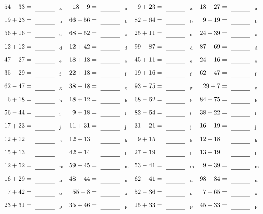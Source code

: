 \documentclass
[
  draft    = true,
  fontsize = 11pt,
  parskip  = half-
]
{scrartcl}
\begin{document}
\clearpage
\begin{align*}
    \pline{54-33}&=\rline{a}
  & \pline{18+9}&=\rline{a}
  & \pline{9+23}&=\rline{a}
  & \pline{18+27}&=\rline{a} \\[1ex]
    \pline{19+23}&=\rline{b}
  & \pline{66-56}&=\rline{b}
  & \pline{82-64}&=\rline{b}
  & \pline{9+19}&=\rline{b} \\[1ex]
    \pline{56+16}&=\rline{c}
  & \pline{68-52}&=\rline{c}
  & \pline{25+11}&=\rline{c}
  & \pline{24+39}&=\rline{c} \\[1ex]
    \pline{12+12}&=\rline{d}
  & \pline{12+42}&=\rline{d}
  & \pline{99-87}&=\rline{d}
  & \pline{87-69}&=\rline{d} \\[1ex]
    \pline{47-27}&=\rline{e}
  & \pline{18+18}&=\rline{e}
  & \pline{45+11}&=\rline{e}
  & \pline{24-16}&=\rline{e} \\[1ex]
    \pline{35-29}&=\rline{f}
  & \pline{22+18}&=\rline{f}
  & \pline{19+16}&=\rline{f}
  & \pline{62-47}&=\rline{f} \\[1ex]
    \pline{62-47}&=\rline{g}
  & \pline{38-18}&=\rline{g}
  & \pline{93-75}&=\rline{g}
  & \pline{29+7}&=\rline{g} \\[1ex]
    \pline{6+18}&=\rline{h}
  & \pline{18+12}&=\rline{h}
  & \pline{68-62}&=\rline{h}
  & \pline{84-75}&=\rline{h} \\[1ex]
    \pline{56-44}&=\rline{i}
  & \pline{9+18}&=\rline{i}
  & \pline{82-64}&=\rline{i}
  & \pline{38-22}&=\rline{i} \\[1ex]
    \pline{17+23}&=\rline{j}
  & \pline{11+31}&=\rline{j}
  & \pline{31-21}&=\rline{j}
  & \pline{16+19}&=\rline{j} \\[1ex]
    \pline{12+12}&=\rline{k}
  & \pline{12+13}&=\rline{k}
  & \pline{9+15}&=\rline{k}
  & \pline{12+18}&=\rline{k} \\[1ex]
    \pline{15+13}&=\rline{l}
  & \pline{42+14}&=\rline{l}
  & \pline{27-19}&=\rline{l}
  & \pline{13+19}&=\rline{l} \\[1ex]
    \pline{12+52}&=\rline{m}
  & \pline{59-45}&=\rline{m}
  & \pline{53-41}&=\rline{m}
  & \pline{9+39}&=\rline{m} \\[1ex]
    \pline{16+29}&=\rline{n}
  & \pline{48-44}&=\rline{n}
  & \pline{62-41}&=\rline{n}
  & \pline{98-84}&=\rline{n} \\[1ex]
    \pline{7+42}&=\rline{o}
  & \pline{55+8}&=\rline{o}
  & \pline{52-36}&=\rline{o}
  & \pline{7+65}&=\rline{o} \\[1ex]
    \pline{23+31}&=\rline{p}
  & \pline{35+46}&=\rline{p}
  & \pline{15+33}&=\rline{p}
  & \pline{45-33}&=\rline{p}
\end{align*}
\end{document}
